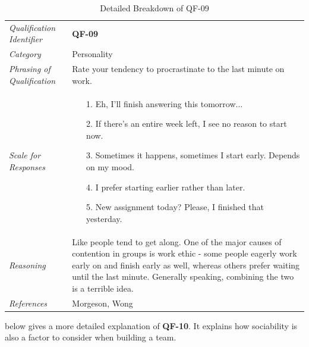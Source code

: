 \documentclass[12pt,letterpaper]{article}
\begin{document}
\begin{table}[H]
	\caption{Detailed Breakdown of QF-09}
	\begin{tabu} to 
		\toprule
		Qualification Identifier & {\bf QF-09}\\
		Category & Personality \\
		Phrasing of Qualification & Rate your tendency to procrastinate to the last minute on work. \\
		Scale for Responses &
		\begin{minipage}[t]{\linewidth}
			\begin{enumerate}
				\item[1.] Eh, I'll finish answering this tomorrow...
				\item[2.] If there's an entire week left, I see no reason to start now.
				\item[3.] Sometimes it happens, sometimes I start early. Depends on my mood.
				\item[4.] I prefer starting earlier rather than later.
				\item[5.] New assignment today? Please, I finished that yesterday.
			\end{enumerate}
		\end{minipage}\\
		Reasoning & Like people tend to get along. One of the major causes of contention in groups is work ethic - some people eagerly work early on and finish early as well, whereas  others prefer waiting until the last minute. Generally speaking, combining the two is a terrible idea.\\
		References & Morgeson\cite{morgeson}, Wong\cite{wong}\\
		\toprule
	\end{tabu}
\end{table}

 below gives a more detailed explanation of {\bf QF-10}. It explains how sociability is also a factor to consider when building a team.
\end{document}
